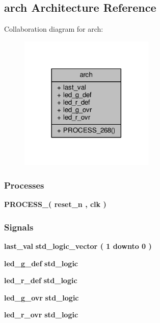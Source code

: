 \subsection{arch Architecture Reference}
\label{classFPGA__LED2__ctrl_1_1arch}


Collaboration diagram for arch\+:\nopagebreak
\begin{figure}[H]
\begin{center}
\leavevmode
\includegraphics[width=182pt]{dc/d2f/classFPGA__LED2__ctrl_1_1arch__coll__graph}
\end{center}
\end{figure}
\subsubsection*{Processes}
 \begin{DoxyCompactItemize}
\item 
{\bf P\+R\+O\+C\+E\+S\+S\+\_}{\bfseries  ( {\bfseries {\bfseries {\bf reset\+\_\+n}} \textcolor{vhdlchar}{ }} , {\bfseries {\bfseries {\bf clk}} \textcolor{vhdlchar}{ }} )}
\end{DoxyCompactItemize}
\subsubsection*{Signals}
 \begin{DoxyCompactItemize}
\item 
{\bf last\+\_\+val} {\bfseries \textcolor{comment}{std\+\_\+logic\+\_\+vector}\textcolor{vhdlchar}{ }\textcolor{vhdlchar}{(}\textcolor{vhdlchar}{ }\textcolor{vhdlchar}{ } \textcolor{vhdldigit}{1} \textcolor{vhdlchar}{ }\textcolor{keywordflow}{downto}\textcolor{vhdlchar}{ }\textcolor{vhdlchar}{ } \textcolor{vhdldigit}{0} \textcolor{vhdlchar}{ }\textcolor{vhdlchar}{)}\textcolor{vhdlchar}{ }} 
\item 
{\bf led\+\_\+g\+\_\+def} {\bfseries \textcolor{comment}{std\+\_\+logic}\textcolor{vhdlchar}{ }} 
\item 
{\bf led\+\_\+r\+\_\+def} {\bfseries \textcolor{comment}{std\+\_\+logic}\textcolor{vhdlchar}{ }} 
\item 
{\bf led\+\_\+g\+\_\+ovr} {\bfseries \textcolor{comment}{std\+\_\+logic}\textcolor{vhdlchar}{ }} 
\item 
{\bf led\+\_\+r\+\_\+ovr} {\bfseries \textcolor{comment}{std\+\_\+logic}\textcolor{vhdlchar}{ }} 
\end{DoxyCompactItemize}


